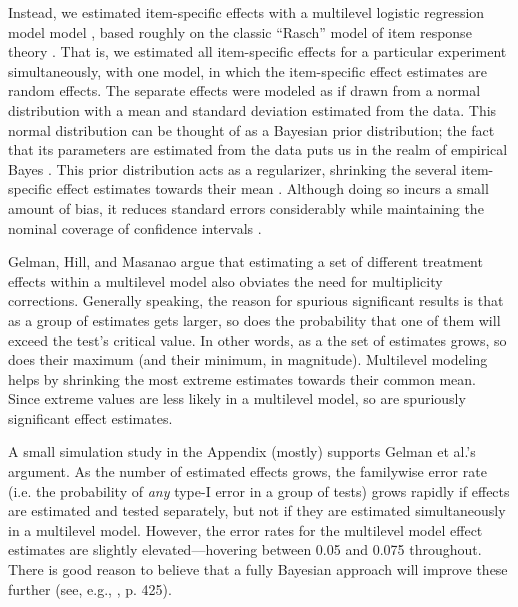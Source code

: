 \documentclass{edm_article}
\begin{document}
Instead, we estimated item-specific effects with a multilevel logistic
regression model model
\cite{gelmanHill}, based roughly on the classic ``Rasch'' model of
item response theory \cite{van2013handbook}\cite{rasch}.
That is, we estimated all item-specific effects for a particular
experiment simultaneously, with one model, in which the item-specific
effect estimates are random effects.
The separate effects were modeled as if drawn from a normal
distribution with a mean and standard deviation estimated from the
data.
This normal distribution can be thought of as a Bayesian prior
distribution; the fact that its parameters are estimated from the data
puts us in the realm of empirical Bayes
\cite{casella1985introduction}.
This prior distribution acts as a regularizer, shrinking the several
item-specific effect estimates towards their mean
\cite{morris1983parametric}.
Although doing so incurs a small amount of bias, it reduces standard
errors considerably while maintaining the nominal coverage of
confidence intervals \cite{sales2018bayesian}.

Gelman, Hill, and Masanao \cite{gelman2012we} argue that estimating a set of different treatment effects within a multilevel
model also obviates the need for multiplicity corrections.
Generally speaking, the reason for spurious significant results is
that as a group of estimates gets larger, so does the probability that
one of them will exceed the test's critical value.
In other words, as a the set of estimates grows, so does their maximum
(and their minimum, in magnitude).
Multilevel modeling helps by shrinking the most extreme estimates
towards their common mean.
Since extreme values are less likely in a multilevel model, so are
spuriously significant effect estimates.

A small simulation study in the Appendix (mostly) supports Gelman et
al.'s argument.
As the number of estimated effects grows, the familywise error rate
(i.e. the probability of \emph{any} type-I error in a group of tests)
grows rapidly if effects are estimated and tested separately, but not
if they are estimated simultaneously in a multilevel model.
However, the error rates for the multilevel model effect estimates are
slightly elevated---hovering between 0.05 and 0.075 throughout.
There is good reason to believe that a fully Bayesian approach will
improve these further (see, e.g., \cite{raudenbush2002hierarchical},
p. 425).
\end{document}
